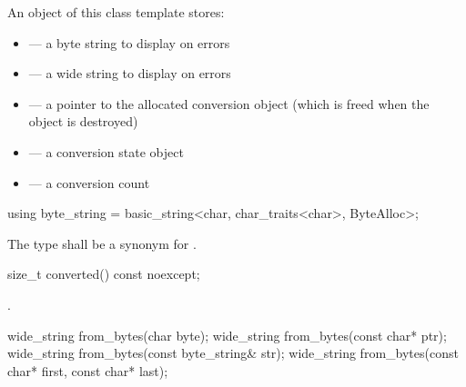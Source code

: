 \pnum
An object of this class template stores:

\begin{itemize}
\item {} --- a byte string to display on errors
\item {} --- a wide string to display on errors
\item {} --- a pointer to the allocated conversion object
(which is freed when the  object is destroyed)
\item {} --- a conversion state object
\item {} --- a conversion count
\end{itemize}

%
\begin{itemdecl}
using byte_string = basic_string<char, char_traits<char>, ByteAlloc>;
\end{itemdecl}

\begin{itemdescr}
\pnum
The type shall be a synonym for .
\end{itemdescr}

%
\begin{itemdecl}
size_t converted() const noexcept;
\end{itemdecl}

\begin{itemdescr}
\pnum
\returns
{}.
\end{itemdescr}

%
\begin{itemdecl}
wide_string from_bytes(char byte);
wide_string from_bytes(const char* ptr);
wide_string from_bytes(const byte_string& str);
wide_string from_bytes(const char* first, const char* last);
\end{itemdecl}

